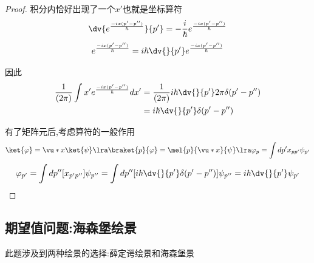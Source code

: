 \begin{formal}
\begin{proof}
                    积分内恰好出现了一个$x'$也就是坐标算符
                    $$ \dv{e^{\frac{-ix(p'-p'')}{\hbar}}}{p'} = -\frac{i}{\hbar} e^{\frac{-ix(p'-p'')}{\hbar}}$$
                    $$ e^{\frac{-ix(p'-p'')}{\hbar}} = i\hbar \dv{}{p'} e^{\frac{-ix(p'-p'')}{\hbar}}$$
                    
                    因此
                    \begin{align*}
                         \frac{1}{(2 \pi)} \int x' e^{\frac{-ix(p'-p'')}{\hbar}}   dx' &=  \frac{1}{(2 \pi)}  i\hbar \dv{}{p'} 2\pi \delta(p'-p'')    \\
                                                                                      &= i \hbar \dv{}{p'} \delta(p'-p'')                          \\                                   
                    \end{align*}
    
                    有了矩阵元后,考虑算符的一般作用
                    $$ \ket{\varphi} = \vu*{x} \ket{\psi} \lra \braket{p}{\varphi}=\mel{p}{\vu*{x}}{\psi} \lra \varphi_{p} = \int dp' x_{pp'} \psi_{p'}$$
                    $$ \varphi_{p'} =  \int dp'' [x_{p'p''}] \psi_{p''} = \int dp'' [i \hbar \dv{}{p'} \delta(p'-p'')] \psi_{p''} = i\hbar \dv{}{p'} \psi_{p'} $$
    
                    
                
                \end{proof}
            \end{formal}
            


        \subsection{期望值问题:海森堡绘景}
            此题涉及到两种绘景的选择:薛定谔绘景和海森堡景
            
